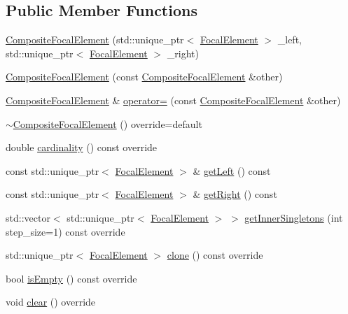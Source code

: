 \subsection*{Public Member Functions}
\begin{DoxyCompactItemize}
\item 
\hyperlink{classCompositeFocalElement_a5edb45a7eb4e963f8a3fe9f5e86dbcc2}{Composite\+Focal\+Element} (std\+::unique\+\_\+ptr$<$ \hyperlink{classFocalElement}{Focal\+Element} $>$ \+\_\+left, std\+::unique\+\_\+ptr$<$ \hyperlink{classFocalElement}{Focal\+Element} $>$ \+\_\+right)
\item 
\hyperlink{classCompositeFocalElement_ad7bf43cd99f64e40b1db1d02dbb69713}{Composite\+Focal\+Element} (const \hyperlink{classCompositeFocalElement}{Composite\+Focal\+Element} \&other)
\item 
\hyperlink{classCompositeFocalElement}{Composite\+Focal\+Element} \& \hyperlink{classCompositeFocalElement_a08412d0e70bab10c523baa83b6eb1937}{operator=} (const \hyperlink{classCompositeFocalElement}{Composite\+Focal\+Element} \&other)
\item 
\hyperlink{classCompositeFocalElement_a29f321b81347d8d687aca284e0507aec}{$\sim$\+Composite\+Focal\+Element} () override=default
\item 
double \hyperlink{classCompositeFocalElement_a18a671ee1759b5df42770384ace275fd}{cardinality} () const override
\item 
const std\+::unique\+\_\+ptr$<$ \hyperlink{classFocalElement}{Focal\+Element} $>$ \& \hyperlink{classCompositeFocalElement_af4e6a58bc9db40cde3446b76d91f5e57}{get\+Left} () const 
\item 
const std\+::unique\+\_\+ptr$<$ \hyperlink{classFocalElement}{Focal\+Element} $>$ \& \hyperlink{classCompositeFocalElement_aef97b94d2375742722833674a3f38a54}{get\+Right} () const 
\item 
std\+::vector$<$ std\+::unique\+\_\+ptr$<$ \hyperlink{classFocalElement}{Focal\+Element} $>$ $>$ \hyperlink{classCompositeFocalElement_aae945111cdffaaa5dc3216e439ac6ad2}{get\+Inner\+Singletons} (int step\+\_\+size=1) const override
\item 
std\+::unique\+\_\+ptr$<$ \hyperlink{classFocalElement}{Focal\+Element} $>$ \hyperlink{classCompositeFocalElement_a3ae99f9c094419664e443d650560baf4}{clone} () const override
\item 
bool \hyperlink{classCompositeFocalElement_a015e5fa735f796d4ac38aec2e332b49a}{is\+Empty} () const override
\item 
void \hyperlink{classCompositeFocalElement_a010c40507f9c45da7327f0418ea32b53}{clear} () override
\end{DoxyCompactItemize}


